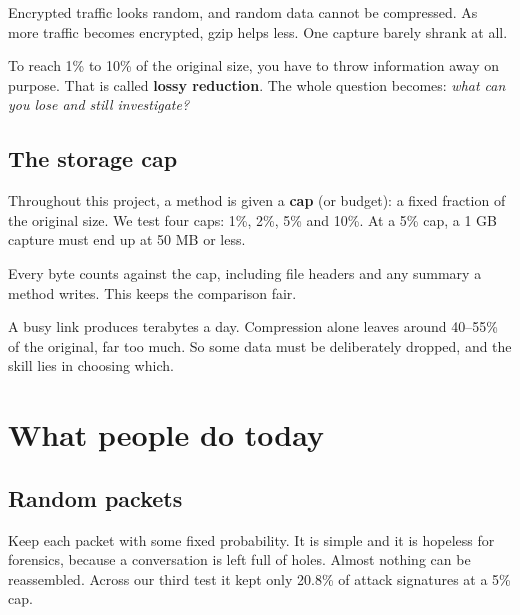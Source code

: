 Encrypted traffic looks random, and random data cannot be compressed. As more traffic becomes encrypted, gzip helps less. One capture barely shrank at all.

\begin{bigidea}
To reach 1\% to 10\% of the original size, you have to throw information away on purpose. That is called \textbf{lossy reduction}. The whole question becomes: \emph{what can you lose and still investigate?}
\end{bigidea}

\section{The storage cap}
Throughout this project, a method is given a \textbf{cap} (or budget): a fixed fraction of the original size. We test four caps: 1\%, 2\%, 5\% and 10\%. At a 5\% cap, a 1 GB capture must end up at 50 MB or less.

Every byte counts against the cap, including file headers and any summary a method writes. This keeps the comparison fair.

\begin{recap}
A busy link produces terabytes a day. Compression alone leaves around 40--55\% of the original, far too much. So some data must be deliberately dropped, and the skill lies in choosing which.
\end{recap}

\chapter{What people do today}
\label{ch:existing}

\newcommand{\minirow}[3]{%
  \node[anchor=east,font=\footnotesize] at (-1.5mm,#1+1.4mm) {#2};
  \foreach \i in {0,...,23} \fill[paleline,rounded corners=.5pt] (\i*3.4mm,#1) rectangle ++(2.8mm,2.8mm);
  \foreach \i in {#3} \fill[accent,rounded corners=.5pt] (\i*3.4mm,#1) rectangle ++(2.8mm,2.8mm);
}

\section{Random packets}
Keep each packet with some fixed probability. It is simple and it is hopeless for forensics, because a conversation is left full of holes. Almost nothing can be reassembled. Across our third test it kept only 20.8\% of attack signatures at a 5\% cap.

